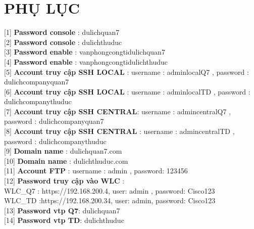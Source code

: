 \documentclass[a4paper, 12pt]{article}
\begin{document}
\section*{PHỤ LỤC}
\hspace*{0.25cm}[1] \textbf{Password console }: dulichquan7\\
\hspace*{1cm}[2] \textbf{Password console }: dulichthuduc\\
\hspace*{1cm}[3] \textbf{Password enable} : vanphongcongtidulichquan7\\
\hspace*{1cm}[4] \textbf{Password enable} : vanphongcongtidulichthuduc\\
\hspace*{1cm}[5] \textbf{Account truy cập SSH LOCAL }: username : adminlocalQ7  , password : dulichcompanyquan7 \\
\hspace*{1cm}[6] \textbf{Account truy cập SSH LOCAL }: username : adminlocalTD  , password : dulichcompanythuduc\\
\hspace*{1cm}[7] \textbf{Account truy cập SSH CENTRAL}: username : admincentralQ7  , password : dulichcompanyquan7 \\
\hspace*{1cm}[8] \textbf{Account truy cập SSH CENTRAL }: username : admincentralTD  , password : dulichcompanythuduc\\
\hspace*{1cm}[9] \textbf{Domain name} : dulichquan7.com\\
\hspace*{1cm}[10] \textbf{Domain name} : dulichthuduc.com\\
\hspace*{1cm}[11] \textbf{Account FTP } : username : admin , password: 123456\\
\hspace*{1cm}[12] \textbf{Password truy cập vào WLC } :\\
\hspace*{2cm} WLC\_Q7 : https://192.168.200.4, user: admin , password: Cisco123\\
\hspace*{2cm} WLC\_TD :https://192.168.200.34, user: admin,  password: Cisco123\\
\hspace*{1cm}[13] \textbf{Password vtp Q7}: dulichquan7\\
\hspace*{1cm}[14] \textbf{Password vtp TD}: dulichthuduc\\
\cleardoublepage
\end{document}
